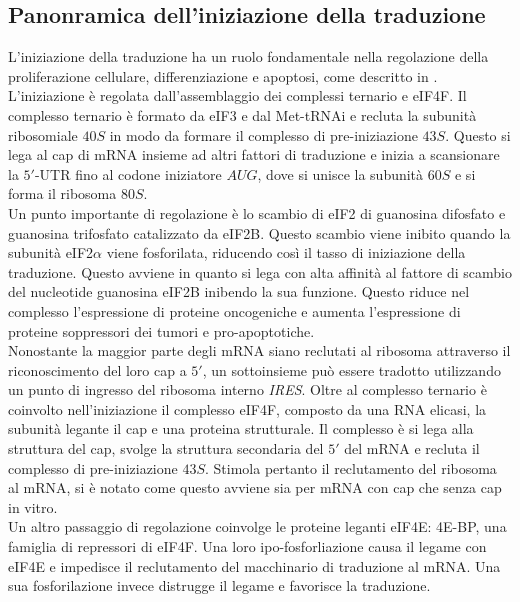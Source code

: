 	\subsection{Panonramica dell'iniziazione della traduzione}
	L'iniziazione della traduzione ha un ruolo fondamentale nella regolazione della proliferazione cellulare, differenziazione e apoptosi, come descritto in \cite{transconp53}.
	L'iniziazione \`e regolata dall'assemblaggio dei complessi ternario e eIF4F.
	Il complesso ternario \`e formato da eIF3 e dal Met-tRNAi e recluta la subunit\`a ribosomiale $40S$ in modo da formare il complesso di pre-iniziazione $43S$.
	Questo si lega al cap di mRNA insieme ad altri fattori di traduzione e inizia a scansionare la $5'$-UTR fino al codone iniziatore $AUG$, dove si unisce la subunit\`a $60S$ e si forma il ribosoma $80S$.\\
	Un punto importante di regolazione \`e lo scambio di eIF2 di guanosina difosfato e guanosina trifosfato catalizzato da eIF2B.
	Questo scambio viene inibito quando la subunit\`a eIF2$\alpha$ viene fosforilata, riducendo cos\`i il tasso di iniziazione della traduzione.
	Questo avviene in quanto si lega con alta affinit\`a al fattore di scambio del nucleotide guanosina eIF2B inibendo la sua funzione.
	Questo riduce nel complesso l'espressione di proteine oncogeniche e aumenta l'espressione di proteine soppressori dei tumori e pro-apoptotiche.\\
	Nonostante la maggior parte degli mRNA siano reclutati al ribosoma attraverso il riconoscimento del loro cap a $5'$, un sottoinsieme pu\`o essere tradotto utilizzando un punto di ingresso del ribosoma interno \emph{IRES}.
	Oltre al complesso ternario \`e coinvolto nell'iniziazione il complesso eIF4F, composto da una RNA elicasi, la subunit\`a legante il cap e una proteina strutturale.
	Il complesso \`e si lega alla struttura del cap, svolge la struttura secondaria del $5'$ del mRNA e recluta il complesso di pre-iniziazione $43S$.
	Stimola pertanto il reclutamento del ribosoma al mRNA, si \`e notato come questo avviene sia per mRNA con cap che senza cap in vitro.\\
	Un altro passaggio di regolazione coinvolge le proteine leganti eIF4E: 4E-BP, una famiglia di repressori di eIF4F.
	Una loro ipo-fosforliazione causa il legame con eIF4E e impedisce il reclutamento del macchinario di traduzione al mRNA.
	Una sua fosforilazione invece distrugge il legame e favorisce la traduzione.

